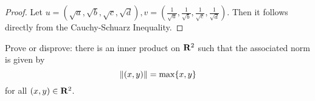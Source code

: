 \begin{proof}
	Let \(u = \left(\sqrt{a}, \sqrt{b}, \sqrt{c}, \sqrt{d}\right), v = \left(\frac{1}{\sqrt{a}}, \frac{1}{\sqrt{b}}, \frac{1}{\sqrt{c}}, \frac{1}{\sqrt{d}}\right)\). Then it follows directly from the Cauchy-Schuarz Inequality.
\end{proof}

\begin{exercise}{17}
	Prove or disprove: there is an inner product on \(\mathbf{R}^{2}\) such that the associated norm is given by
	\[
		\norm{(x, y)} = \max\{x, y\}
	\]
	for all \((x, y) \in \mathbf{R}^{2}\).
\end{exercise}
